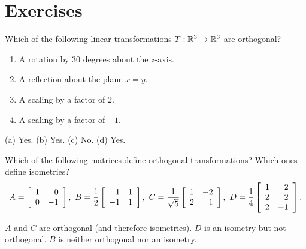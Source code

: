 \documentclass{ximera}
\author{Zack Reed}
\begin{document}
\section*{Exercises}

\begin{exercise}
  Which of the following linear transformations $T:\R^3\to\R^3$ are
  orthogonal?
  \begin{enumerate}
  \item A rotation by 30 degrees about the $z$-axis.
  \item A reflection about the plane $x=y$.
  \item A scaling by a factor of $2$.
  \item A scaling by a factor of $-1$.
  \end{enumerate}
  \begin{solution}
    (a) Yes. (b) Yes. (c) No. (d) Yes.
  \end{solution}
\end{exercise}

\begin{exercise}
  Which of the following matrices define orthogonal transformations?
  Which ones define isometries?
  \begin{equation*}
    A = \startmat{rr}
      1 &  0 \\
      0 & -1 \\
    \stopmat,\quad
    B = \frac{1}{2}\startmat{rr}
      1 & 1 \\
      -1 & 1 \\
    \stopmat,\quad
    C = \frac{1}{\sqrt{5}}\startmat{rr}
      1 & -2 \\
      2 &  1 \\
    \stopmat,\quad
    D = \frac{1}{4}\startmat{rr}
      1 &  2 \\
      2 &  2 \\
      2 & -1 \\
    \stopmat.
  \end{equation*}
  \begin{solution}
    $A$ and $C$ are orthogonal (and therefore isometries). $D$ is an
    isometry but not orthogonal. $B$ is neither orthogonal nor an isometry.
  \end{solution}
\end{exercise}
\end{document}
